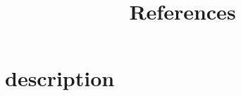 \documentclass[conference]{IEEEtran}
\theoremstyle{plain}
\begin{document}
\title{References}
\author{}

\maketitle

\section{description}
   \label{sec:description}
   







 
\end{document}
